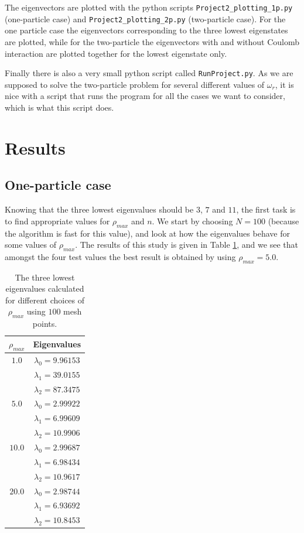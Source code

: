\documentclass[12pt, a4paper]{article}
\begin{document}
The eigenvectors are plotted with the python scripts \texttt{Project2\_plotting\_1p.py} 
(one-particle case) and \texttt{Project2\_plotting\_2p.py} (two-particle case). For the one particle case 
the eigenvectors corresponding to the three lowest eigenstates are plotted, while for the two-particle 
the eigenvectors with and without Coulomb interaction are plotted together for the lowest eigenstate only.

Finally there is also a very small python script called \texttt{RunProject.py}. As we are supposed to 
solve the two-particle problem for several different values of $\omega_r$, it is nice with a script that 
runs the program for all the cases we want to consider, which is what this script does. 

\section{Results}

\subsection{One-particle case}

Knowing that the three lowest eigenvalues should be $3$, $7$ and $11$, the first task is to find 
appropriate values for $\rho_{max}$ and $n$. We start by choosing $N=100$ (because the algorithm is 
fast for this value), and look at how the eigenvalues behave for some values of $\rho_{max}$. 
The results of this study is given in Table \ref{tab:rho_max}, and we see that amongst the four 
test values the best result is obtained by using $\rho_{max} = 5.0$. 

\begin{table}[ht!]
\begin{center}
\caption{The three lowest eigenvalues calculated for different choices of $\rho_{max}$ using 
$100$ mesh points.}
\label{tab:rho_max}
\begin{tabular}{cc} \\ \hline\hline  
$\rho_{max}$ & Eigenvalues \\ \hline 
$1.0$ & $\lambda_0 = 9.96153$  \\
	  & $\lambda_1 = 39.0155$  \\
	  & $\lambda_2 = 87.3475$  \\  \hline 
$5.0$ & $\lambda_0 = 2.99922$  \\
	  & $\lambda_1 = 6.99609$  \\
	  & $\lambda_2 = 10.9906$  \\  \hline 
$10.0$ & $\lambda_0 = 2.99687$  \\
	  & $\lambda_1 = 6.98434$  \\
	  & $\lambda_2 = 10.9617$  \\  \hline 
$20.0$ & $\lambda_0 = 2.98744$  \\
	  & $\lambda_1 = 6.93692$  \\
	  & $\lambda_2 = 10.8453$  \\  \hline \hline 	  
\end{tabular}
\end{center}
\end{table} 
\end{document}
